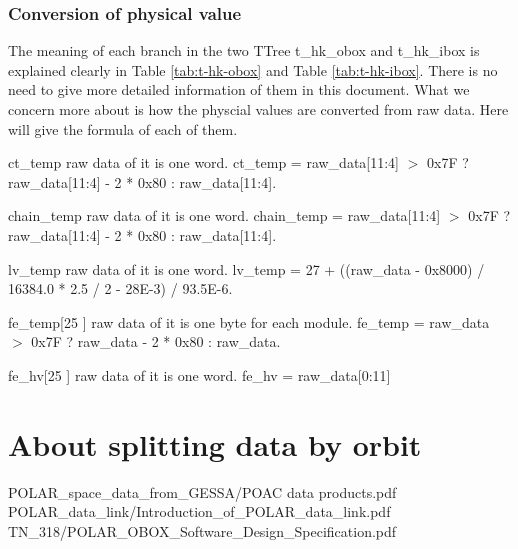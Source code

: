 \documentclass[a4paper, 12pt, onecolumn]{article}
\begin{document}
\subsubsection{Conversion of physical value}
The meaning of each branch in the two TTree t\_hk\_obox and t\_hk\_ibox is explained clearly in Table \ref{tab:t-hk-obox} and Table \ref{tab:t-hk-ibox}.
There is no need to give more detailed information of them in this document.
What we concern more about is how the physcial values are converted from raw data. Here will give the formula of each of them.

\begin{asparadesc}
\item[ct\_temp] raw data of it is one word. ct\_temp = raw\_data[11:4] $>$ 0x7F ? raw\_data[11:4] - 2 * 0x80 : raw\_data[11:4].
\item[chain\_temp] raw data of it is one word. chain\_temp = raw\_data[11:4] $>$ 0x7F ? raw\_data[11:4] - 2 * 0x80 : raw\_data[11:4].
\item[lv\_temp] raw data of it is one word. lv\_temp = 27 + ((raw\_data - 0x8000) / 16384.0 * 2.5 / 2 - 28E-3) / 93.5E-6.
\item[fe\_temp[25]] raw data of it is one byte for each module. fe\_temp = raw\_data $>$ 0x7F ? raw\_data - 2 * 0x80 : raw\_data.
\item[fe\_hv[25]] raw data of it is one word. fe\_hv = raw\_data[0:11] 
\end{asparadesc}


\section{About splitting data by orbit}
\begin{thebibliography}{9}
 POLAR\_space\_data\_from\_GESSA/POAC data products.pdf
 POLAR\_data\_link/Introduction\_of\_POLAR\_data\_link.pdf
 TN\_318/POLAR\_OBOX\_Software\_Design\_Specification.pdf
\end{thebibliography}
\end{document}
